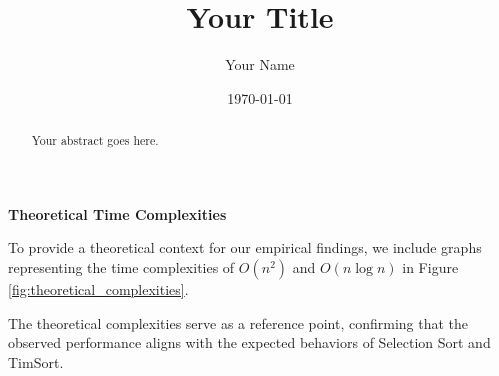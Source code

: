 \documentclass[twocolumn]{article}
\begin{document}
\title{Your Title}
\author{Your Name}
\date{\today}
\maketitle

\begin{abstract}
Your abstract goes here.
\end{abstract}

\begin{multicols}{2}
    \noindent
    \textbf{Theoretical Time Complexities}

    To provide a theoretical context for our empirical findings, we include graphs representing the time complexities of \(O(n^2)\) and \(O(n \log n)\) in Figure \ref{fig:theoretical_complexities}.

    The theoretical complexities serve as a reference point, confirming that the observed performance aligns with the expected behaviors of Selection Sort and TimSort.


\end{multicols}
\end{document}
